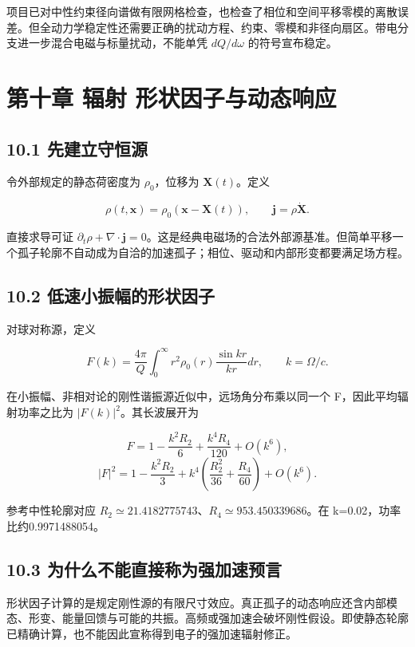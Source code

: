 \documentclass[UTF8,fontset=fandol,11pt]{ctexart}
\begin{document}
项目已对中性约束径向谱做有限网格检查，也检查了相位和空间平移零模的离散误差。但全动力学稳定性还需要正确的扰动方程、约束、零模和非径向扇区。带电分支进一步混合电磁与标量扰动，不能单凭 \(dQ/d\omega\) 的符号宣布稳定。

\section*{第十章 辐射 形状因子与动态响应}

\subsection*{10.1 先建立守恒源}

令外部规定的静态荷密度为 \(\rho_0\)，位移为 \(\mathbf X(t)\)。定义

\[
\rho(t,\mathbf x)=\rho_0(\mathbf x-\mathbf X(t)),
\qquad \mathbf j=\rho\dot{\mathbf X}.
\tag{10.1}
\]

直接求导可证 \(\partial_t\rho+\nabla\cdot\mathbf j=0\)。这是经典电磁场的合法外部源基准。但简单平移一个孤子轮廓不自动成为自洽的加速孤子；相位、驱动和内部形变都要满足场方程。

\subsection*{10.2 低速小振幅的形状因子}

对球对称源，定义

\[
F(k)=\frac{4\pi}{Q}\int_0^\infty r^2\rho_0(r)\frac{\sin kr}{kr}dr,
\qquad k=\Omega/c.
\tag{10.2}
\]

在小振幅、非相对论的刚性谐振源近似中，远场角分布乘以同一个 F，因此平均辐射功率之比为 \(|F(k)|^2\)。其长波展开为

\[
F=1-\frac{k^2R_2}{6}+\frac{k^4R_4}{120}+O(k^6),
\]
\[
|F|^2=1-\frac{k^2R_2}{3}
+k^4\left(\frac{R_2^2}{36}+\frac{R_4}{60}\right)+O(k^6).
\tag{10.3}
\]

参考中性轮廓对应 \(R_2\simeq21.4182775743\)、\(R_4\simeq953.450339686\)。在 k=0.02，功率比约0.9971488054。

\subsection*{10.3 为什么不能直接称为强加速预言}

形状因子计算的是规定刚性源的有限尺寸效应。真正孤子的动态响应还含内部模态、形变、能量回馈与可能的共振。高频或强加速会破坏刚性假设。即使静态轮廓已精确计算，也不能因此宣称得到电子的强加速辐射修正。
\end{document}
